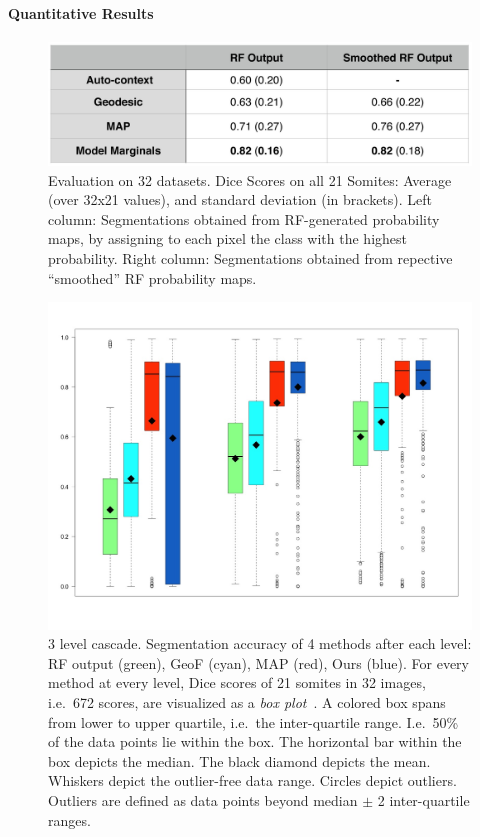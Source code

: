 \documentclass[10pt,twocolumn,letterpaper]{article}
\begin{document}
\paragraph{Quantitative Results}
%
\begin{figure}[t]
\begin{center}
\includegraphics[width=\columnwidth]{TableDiceScores_2columns_noGeoF2.jpg} %
\caption{Evaluation on 32 datasets. Dice Scores on all 21 Somites: Average (over 32x21 values), and standard deviation (in brackets). Left column: Segmentations obtained from RF-generated probability maps, by assigning to each pixel the class with the highest probability. Right column: Segmentations obtained from repective ``smoothed'' RF probability maps.}
\label{tab:results}
\end{center}
\end{figure}
%
\begin{figure}[tb]
\centering
\small
\begin{center}
\includegraphics[width=\columnwidth]{Cascade.jpeg} %
\end{center}
\label{fig:boxplots}
\caption{3 level cascade. Segmentation accuracy of 4 methods after each level: RF output (green), GeoF (cyan), MAP (red), Ours (blue). For every method at every level, Dice scores of 21 somites in 32 images, i.e.\ 672 scores, are visualized as a \emph{box plot}~\cite{chambers1983graphical}. A colored box spans from lower to upper quartile, i.e.\ the inter-quartile range. I.e.\ 50\% of the data points lie within the box. The horizontal bar within the box depicts the median. The black diamond depicts the mean. Whiskers depict the outlier-free data range. Circles depict outliers. Outliers are defined as data points beyond median $\pm$ 2 inter-quartile ranges. }
\end{figure}
\end{document}
